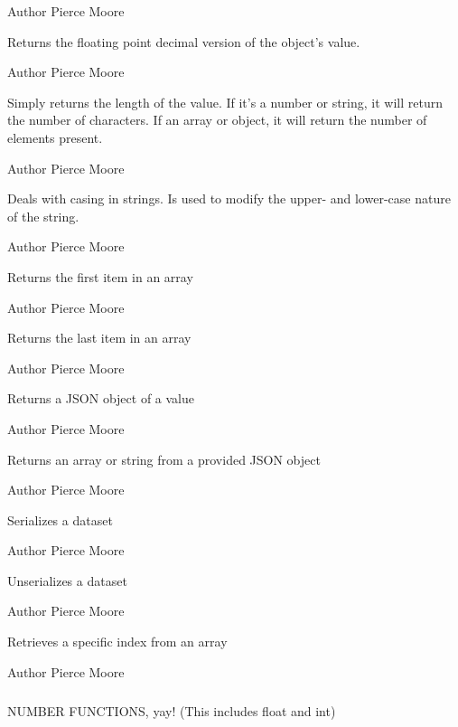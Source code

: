 \begin{DoxyAuthor}{Author}
Pierce Moore
\end{DoxyAuthor}
Returns the floating point decimal version of the object's value.

\begin{DoxyAuthor}{Author}
Pierce Moore
\end{DoxyAuthor}
Simply returns the length of the value. If it's a number or string, it will return the number of characters. If an array or object, it will return the number of elements present.

\begin{DoxyAuthor}{Author}
Pierce Moore
\end{DoxyAuthor}
Deals with casing in strings. Is used to modify the upper-\/ and lower-\/case nature of the string.

\begin{DoxyAuthor}{Author}
Pierce Moore
\end{DoxyAuthor}
Returns the first item in an array

\begin{DoxyAuthor}{Author}
Pierce Moore
\end{DoxyAuthor}
Returns the last item in an array

\begin{DoxyAuthor}{Author}
Pierce Moore
\end{DoxyAuthor}
Returns a J\-S\-O\-N object of a value

\begin{DoxyAuthor}{Author}
Pierce Moore
\end{DoxyAuthor}
Returns an array or string from a provided J\-S\-O\-N object

\begin{DoxyAuthor}{Author}
Pierce Moore
\end{DoxyAuthor}
Serializes a dataset

\begin{DoxyAuthor}{Author}
Pierce Moore
\end{DoxyAuthor}
Unserializes a dataset

\begin{DoxyAuthor}{Author}
Pierce Moore
\end{DoxyAuthor}
Retrieves a specific index from an array

\begin{DoxyAuthor}{Author}
Pierce Moore
\end{DoxyAuthor}
\subparagraph*{}

\begin{DoxyVerb}                   NUMBER FUNCTIONS, yay! (This includes float and int)\end{DoxyVerb}
 \subparagraph*{}

